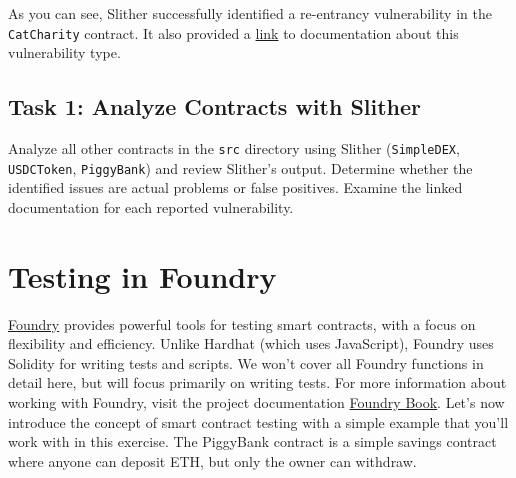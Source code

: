 \documentclass[12pt]{article}
\begin{document}
As you can see, Slither successfully identified a re-entrancy vulnerability in
the \texttt{CatCharity} contract. It also provided a
\href{https://github.com/crytic/slither/wiki/Detector-Documentation#reentrancy-vulnerabilities}{link}
to documentation about this vulnerability type.

\subsection*{Task 1: Analyze Contracts with Slither}
Analyze all other contracts in the \texttt{src} directory using Slither
(\texttt{SimpleDEX}, \texttt{USDCToken}, \texttt{PiggyBank}) and review
Slither's output. Determine whether the identified issues are actual problems
or false positives. Examine the linked documentation for each reported
vulnerability.







\section{Testing in Foundry}

\href{https://github.com/foundry-rs/foundry}{Foundry} provides powerful tools for testing smart contracts, with a focus on flexibility and efficiency. Unlike Hardhat (which uses JavaScript), Foundry uses Solidity for writing tests and scripts. We won't cover all Foundry functions in detail here, but will focus primarily on writing tests. For more information about working with Foundry, visit the project documentation \href{https://book.getfoundry.sh/}{Foundry Book}. Let's now introduce the concept of smart contract testing with a simple example that you'll work with in this exercise. The PiggyBank contract is a simple savings contract where anyone can deposit ETH, but only the owner can withdraw.
\end{document}
